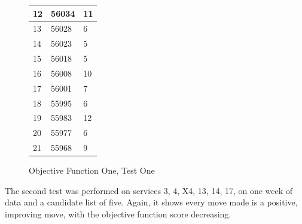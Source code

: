 \documentclass{article}
\begin{document}
\begin{figure}[H]
\begin{tabular}{|l|l|l|}
	\hline
	12                                                        & 56034                                                             & 11      \\ 
	\hline
	13                                                        & 56028                                                             & 6       \\ 
	\hline
	14                                                        & 56023                                                             & 5       \\ 
	\hline
	15                                                        & 56018                                                             & 5       \\ 
	\hline
	16                                                        & 56008                                                             & 10      \\ 
	\hline
	17                                                        & 56001                                                             & 7       \\ 
	\hline
	18                                                        & 55995                                                             & 6       \\ 
	\hline
	19                                                        & 55983                                                             & 12      \\ 
	\hline
	20                                                        & 55977                                                             & 6       \\ 
	\hline
	21                                                        & 55968                                                             & 9       \\
	\hline
\end{tabular}
	\caption{Objective Function One, Test One}
\end{figure}




\newpage

The second test was performed on services 3, 4, X4, 13, 14, 17, on one week of data and a candidate list of five. Again, it shows every move made is a positive, improving move, with the objective function score decreasing. 
\end{document}
